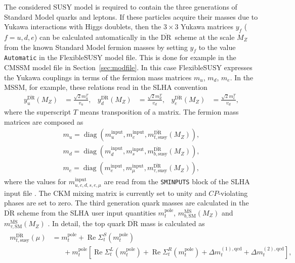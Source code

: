 \documentclass[final,3p,11pt,pdflatex]{elsarticle}
\makeatletter
\newcommand{\fs}{FlexibleSUSY\@\xspace}
\newcommand{\code}[1]{\lstinline|#1|}  %
\newcommand{\textoverline}[1]{$\overline{\mbox{#1}}$}
\newcommand{\DRbar}{\textoverline{DR}\xspace}
\newcommand{\MSbar}{\textoverline{MS}\xspace}
\newcommand{\userinput}{\text{input}}
\newcommand{\secref}[1]{Section~\ref{#1}}
\DeclareMathOperator{\diag}{diag}
\DeclareMathOperator{\re}{Re}
\makeatother
\begin{document}
The considered SUSY model is required to contain the three generations
of Standard Model quarks and leptons.  If these particles acquire
their masses due to Yukawa interactions with Higgs doublets, then the
$3\times 3$ Yukawa matrices $y_f$ ($f=u,d,e$) can be calculated
automatically in the \DRbar\ scheme at the scale $M_Z$ from the known
Standard Model fermion masses by setting $y_f$ to the value
\code{Automatic} in the \fs model file.
%
This is done for example in
the CMSSM model file in \secref{sec:modfile}.  In this case \fs
expresses the Yukawa couplings in terms of the fermion mass matrices
$m_u$, $m_d$, $m_e$.  In the MSSM, for example, these relations read
in the SLHA convention \cite{Allanach:2008qq}
%
\begin{align}
  y_u^{\text{\DRbar}}(M_Z) &= \frac{\sqrt{2} m_{u}^T}{v_u} , &
  y_d^{\text{\DRbar}}(M_Z) &= \frac{\sqrt{2} m_{d}^T}{v_d} , &
  y_e^{\text{\DRbar}}(M_Z) &= \frac{\sqrt{2} m_{e}^T}{v_d} ,
\end{align}
%
where the superscript $T$ means transposition of a matrix.  The
fermion mass matrices are composed as
%
\begin{align}
  m_u = \diag(m_{u}^{\userinput}, m_{c}^{\userinput}, m_{t,\text{susy}}^{\text{\DRbar}}(M_Z)) ,\\
  m_d = \diag(m_{d}^{\userinput}, m_{s}^{\userinput}, m_{b,\text{susy}}^{\text{\DRbar}}(M_Z)) ,\\
  m_e = \diag(m_{e}^{\userinput}, m_{\mu}^{\userinput}, m_{\tau,\text{susy}}^{\text{\DRbar}}(M_Z)),
\end{align}
%
where the values for $m_{u,c,d,s,e,\mu}^{\userinput}$ are read from
the \code{SMINPUTS} block of the SLHA input file \cite{Skands:2003cj}.
The CKM mixing matrix is currently set to unity and $CP$-violating
phases are set to zero.  The third generation quark masses are
calculated in the \DRbar scheme from the SLHA user input quantities
$m_t^\text{pole}$, $m_{b,\text{SM}}^{\text{\MSbar}}(M_Z)$ and
$m_{\tau,\text{SM}}^{\text{\MSbar}}(M_Z)$ \cite{Skands:2003cj}.  In
detail, the top quark \DRbar mass is calculated as
%
\begin{align}
  \begin{split}
    m_{t,\text{susy}}^{\text{\DRbar}}(\mu) &= m_t^\text{pole} +
    \re\Sigma_{t}^{S}(m_t^\text{pole}) \\
    &\phantom{=\;} + m_t^\text{pole}
    \left[ \re\Sigma_{t}^{L}(m_t^\text{pole}) +
      \re\Sigma_{t}^{R}(m_t^\text{pole}) + \Delta
      m_t^{(1),\text{qcd}} + \Delta m_t^{(2),\text{qcd}} \right] ,
  \end{split}
\end{align}
\end{document}
